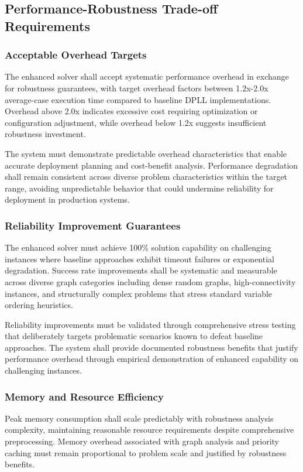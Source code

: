 \subsection{Performance-Robustness Trade-off Requirements}

\subsubsection{Acceptable Overhead Targets}
The enhanced solver shall accept systematic performance overhead in exchange for robustness guarantees, with target overhead factors between 1.2x-2.0x average-case execution time compared to baseline DPLL implementations. Overhead above 2.0x indicates excessive cost requiring optimization or configuration adjustment, while overhead below 1.2x suggests insufficient robustness investment.

The system must demonstrate predictable overhead characteristics that enable accurate deployment planning and cost-benefit analysis. Performance degradation shall remain consistent across diverse problem characteristics within the target range, avoiding unpredictable behavior that could undermine reliability for deployment in production systems.

\subsubsection{Reliability Improvement Guarantees}
The enhanced solver must achieve 100\% solution capability on challenging instances where baseline approaches exhibit timeout failures or exponential degradation. Success rate improvements shall be systematic and measurable across diverse graph categories including dense random graphs, high-connectivity instances, and structurally complex problems that stress standard variable ordering heuristics.

Reliability improvements must be validated through comprehensive stress testing that deliberately targets problematic scenarios known to defeat baseline approaches. The system shall provide documented robustness benefits that justify performance overhead through empirical demonstration of enhanced capability on challenging instances.

\subsubsection{Memory and Resource Efficiency}
Peak memory consumption shall scale predictably with robustness analysis complexity, maintaining reasonable resource requirements despite comprehensive preprocessing. Memory overhead associated with graph analysis and priority caching must remain proportional to problem scale and justified by robustness benefits.

